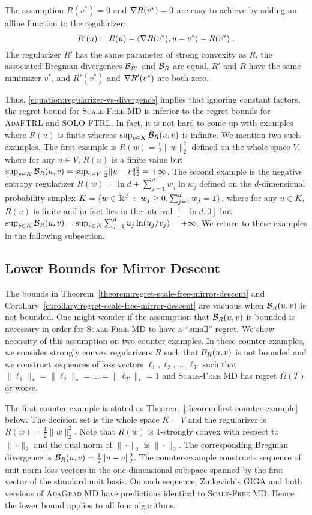 The assumption $R(v^*) = 0$ and $\nabla R(v^*) = 0$
are easy to achieve by adding an affine function to the regularizer:
$$
R'(u) = R(u) - \langle \nabla R(v^*), u - v^* \rangle - R(v^*) \; .
$$
The regularizer $R'$ has the same parameter of strong convexity as $R$, the
associated Bregman divergences $\mathcal{B}_{R'}$ and $\mathcal{B}_{R}$ are equal, $R'$ and
$R$ have the same minimizer $v^*$, and $R'(v^*)$ and $\nabla R'(v^*)$ are both
zero.

Thus, \eqref{equation:regularizer-vs-divergence} implies that ignoring constant
factors, the regret bound for \textsc{Scale-Free MD} is inferior to the regret
bounds for \textsc{AdaFTRL} and \textsc{SOLO FTRL}.  In fact, it is not hard to
come up with examples where $R(u)$ is finite whereas $\sup_{v \in K}
\mathcal{B}_R(u,v)$ is infinite. We mention two such examples. The first example is
$R(w) = \frac{1}{2}\|w\|_2^2$ defined on the whole space $V$, where for any $u
\in V$, $R(u)$ is a finite value but $\sup_{v \in K} \mathcal{B}_R(u,v) = \sup_{v \in
V} \frac{1}{2}\|u-v\|_2^2 = +\infty$. The second example is the negative
entropy regularizer $R(w) = \ln d + \sum_{j=1}^d w_j \ln w_j$ defined on the
$d$-dimensional probability simplex $K = \{ w \in \mathbb{R}^d ~:~ w_j \ge 0,
\sum_{j=1}^d w_j = 1 \}$, where for any $u \in K$, $R(u)$ is finite and in fact
lies in the interval $[-\ln d, 0]$ but $\sup_{v \in K} \mathcal{B}_R(u,v) = \sup_{v
\in K} \sum_{j=1}^d u_j \ln(u_j/v_j) = + \infty$. We return to these examples
in the following subsection.

\subsection{Lower Bounds for Mirror Descent}
\label{subsection:mirror-descent-lower-bound}

The bounds in Theorem~\ref{theorem:regret-scale-free-mirror-descent} and
Corollary~\ref{corollary:regret-scale-free-mirror-descent} are vacuous when
$\mathcal{B}_R(u,v)$ is not bounded. One might wonder if the assumption that
$\mathcal{B}_R(u,v)$ is bounded is necessary in order for \textsc{Scale-Free MD} to
have a ``small'' regret. We show necessity of this assumption on two
counter-examples.  In these counter-examples, we consider strongly convex
regularizers $R$ such that $\mathcal{B}_R(u,v)$ is not bounded and we construct
sequences of loss vectors $\ell_1, \ell_2, \dots, \ell_T$ such that
$\|\ell_1\|_* = \|\ell_2\|_* = \dots = \|\ell_T\|_* = 1$ and \textsc{Scale-Free
MD} has regret $\Omega(T)$ or worse.

The first counter-example is stated as
Theorem~\ref{theorem:first-counter-example} below. The decision set is the
whole space $K=V$ and the regularizer is $R(w) = \frac{1}{2}\|w\|_2^2$. Note
that $R(w)$ is $1$-strongly convex with respect to $\|\cdot\|_2$ and the dual
norm of $\|\cdot\|_2$ is $\|\cdot\|_2$. The corresponding Bregman divergence is
$\mathcal{B}_R(u,v) = \frac{1}{2}\|u-v\|_2^2$. The counter-example constructs
sequence of unit-norm loss vectors in the one-dimensional subspace spanned by
the first vector of the standard unit basis.  On such sequence, Zinkevich's
\textsc{GIGA} and both versions of \textsc{AdaGrad MD} have predictions
identical to \textsc{Scale-Free MD}. Hence the lower bound applies to all four
algorithms.

